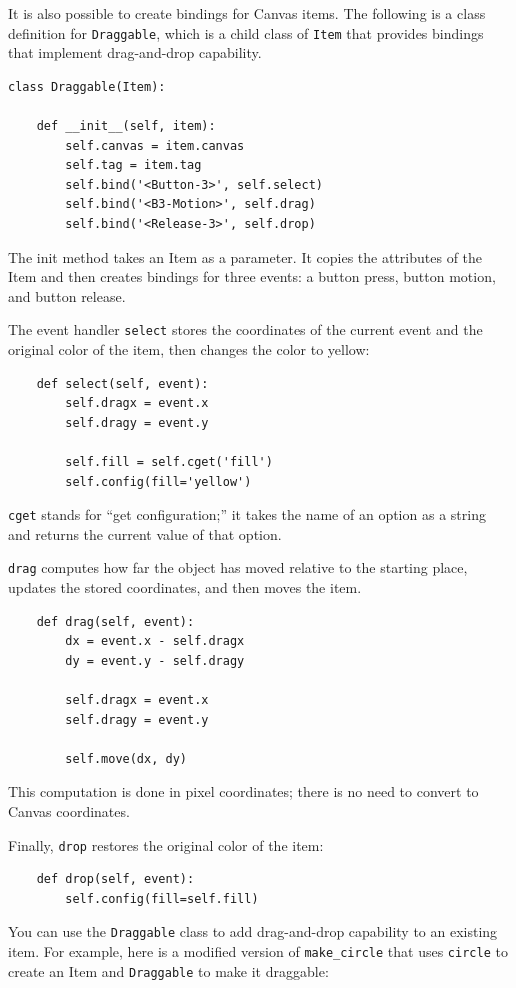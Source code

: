 \documentclass[10pt]{book}
\begin{document}
It is also possible to create bindings for Canvas items.
The following is a class definition for {\tt Draggable},
which is a child class of {\tt Item} that provides bindings
that implement drag-and-drop capability.

\begin{verbatim}
class Draggable(Item):

    def __init__(self, item):
        self.canvas = item.canvas
        self.tag = item.tag
        self.bind('<Button-3>', self.select)
        self.bind('<B3-Motion>', self.drag)
        self.bind('<Release-3>', self.drop)
\end{verbatim}
%
The init method takes an Item as a parameter.  It copies
the attributes of the Item and then creates bindings for
three events: a button press, button motion, and button release.

The event handler {\tt select} stores the coordinates
of the current event and the original color of the item, then
changes the color to yellow:

\begin{verbatim}
    def select(self, event):
        self.dragx = event.x
        self.dragy = event.y

        self.fill = self.cget('fill')
        self.config(fill='yellow')
\end{verbatim}
%
{\tt cget} stands for ``get configuration;'' it takes the name of an
option as a string and returns the current value of that option.

{\tt drag} computes how far the object has moved relative to the
starting place, updates the stored coordinates, and then moves the
item.

\begin{verbatim}
    def drag(self, event):
        dx = event.x - self.dragx
        dy = event.y - self.dragy

        self.dragx = event.x
        self.dragy = event.y

        self.move(dx, dy)
\end{verbatim}
%
This computation is done in pixel coordinates; there is no need to
convert to Canvas coordinates.

Finally, {\tt drop} restores the original color of the item:

\begin{verbatim}
    def drop(self, event):
        self.config(fill=self.fill)
\end{verbatim}
%
You can use the {\tt Draggable} class to add drag-and-drop
capability to an existing item.  For example, here is a modified
version of \verb"make_circle" that uses {\tt circle} to create
an Item and {\tt Draggable} to make it draggable:
\end{document}
